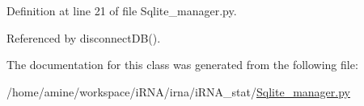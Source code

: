 \-Definition at line 21 of file \-Sqlite\-\_\-manager.\-py.



\-Referenced by disconnect\-D\-B().



\-The documentation for this class was generated from the following file\-:\begin{DoxyCompactItemize}
\item 
/home/amine/workspace/i\-R\-N\-A/irna/i\-R\-N\-A\-\_\-stat/\hyperlink{iRNA__stat_2Sqlite__manager_8py}{\-Sqlite\-\_\-manager.\-py}\end{DoxyCompactItemize}
